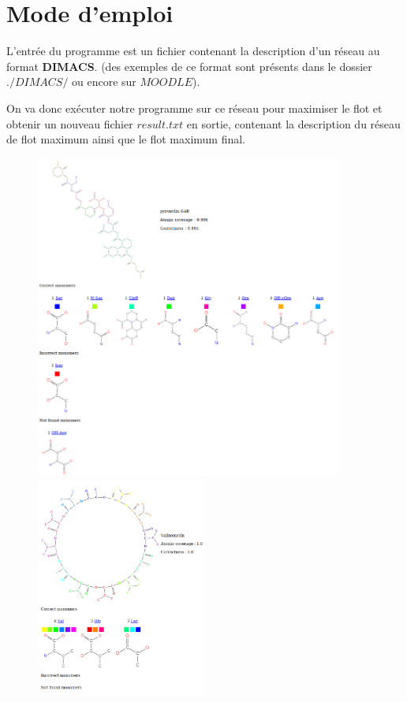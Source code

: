 \documentclass[11pt, a4paper]{report}
\begin{document}
	\chapter{Mode d'emploi}
	
	L'entrée du programme est un fichier contenant la description d'un réseau au format \textbf{DIMACS}. (des exemples de ce format sont présents dans le dossier $./DIMACS/$ ou encore sur $MOODLE$).
	
	On va donc exécuter notre programme sur ce réseau pour maximiser le flot et obtenir un nouveau fichier $result.txt$ en sortie, contenant la description du réseau de flot maximum ainsi que le flot maximum final.
	
	
	
	
	\begin{figure}[H]
		\centering
		\includegraphics[width=0.9\textwidth]{images/pyoverdin G4R.png}
		\hspace{2cm}
		\includegraphics[width=0.5\textwidth]{images/Valinomycin.png}
	\end{figure}
	
\end{document}
